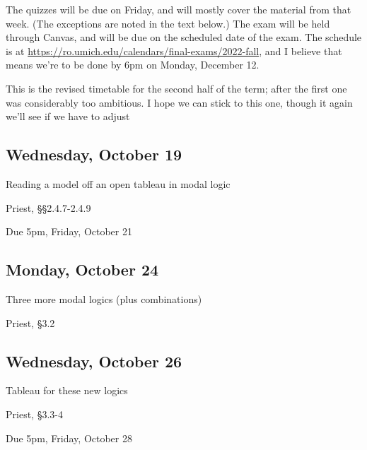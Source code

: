 \documentclass[
]{article}
\providecommand{\tightlist}{%
  \setlength{\itemsep}{0pt}\setlength{\parskip}{0pt}}\usepackage{longtable,booktabs,array}
\begin{document}
The quizzes will be due on Friday, and will mostly cover the material
from that week. (The exceptions are noted in the text below.) The exam
will be held through Canvas, and will be due on the scheduled date of
the exam. The schedule is at
\url{https://ro.umich.edu/calendars/final-exams/2022-fall}, and I
believe that means we're to be done by 6pm on Monday, December 12.

\newpage

This is the revised timetable for the second half of the term; after the
first one was considerably too ambitious. I hope we can stick to this
one, though it again we'll see if we have to adjust

\hypertarget{wednesday-october-19}{%
\subsection{Wednesday, October 19}\label{wednesday-october-19}}

\begin{description}
\tightlist
\item[Topic]
Reading a model off an open tableau in modal logic
\item[Required Reading]
Priest, §§2.4.7-2.4.9
\item[Weekly Quiz]
Due 5pm, Friday, October 21
\end{description}

\hypertarget{monday-october-24}{%
\subsection{Monday, October 24}\label{monday-october-24}}

\begin{description}
\tightlist
\item[Topic]
Three more modal logics (plus combinations)
\item[Required Reading]
Priest, §3.2
\end{description}

\hypertarget{wednesday-october-26}{%
\subsection{Wednesday, October 26}\label{wednesday-october-26}}

\begin{description}
\tightlist
\item[Topic]
Tableau for these new logics
\item[Required Reading]
Priest, §3.3-4
\item[Weekly Quiz]
Due 5pm, Friday, October 28
\end{description}
\end{document}
